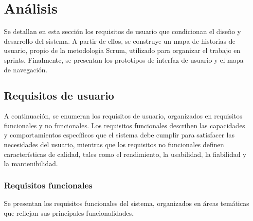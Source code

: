 \section{Análisis} \label{sec:6_analisis}
Se detallan en esta sección los requisitos de usuario que condicionan el diseño y desarrollo del sistema. A partir de ellos, se 
construye un mapa de historias de usuario, propio de la metodología Scrum, utilizado para organizar el trabajo en sprints.
Finalmente, se presentan los prototipos de interfaz de usuario y el mapa de navegación.


\subsection{Requisitos de usuario} \label{subsec:6_1_requisitos_usuario}
A continuación, se enumeran los requisitos de usuario, organizados en requisitos funcionales y no funcionales. Los requisitos funcionales describen las capacidades 
y comportamientos específicos que el sistema debe cumplir para satisfacer las necesidades del usuario, mientras que los requisitos no funcionales 
definen características de calidad, tales como el rendimiento, la usabilidad, la fiabilidad y la mantenibilidad.

\subsubsection{Requisitos funcionales} \label{subsubsec:6_1_1_requisitos_funcionales}
Se presentan los requisitos funcionales del sistema, organizados en áreas temáticas que reflejan sus principales funcionalidades.

\vspace{0.5em}

